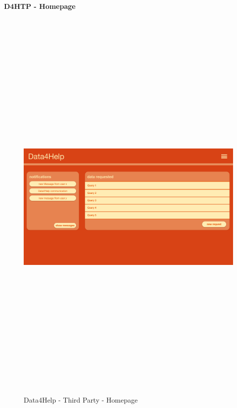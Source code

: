 \paragraph{D4HTP - Homepage}
\begin{figure}[H]
    \includegraphics[width=.6\linewidth, height = 20cm, keepaspectratio]{./Images/Mockups/Data4Help/D4HTP/D4HTP_HomePage.png}
    \centering
    \caption{Data4Help - Third Party - Homepage}
    \label{fig:sab}
  \end{figure}

